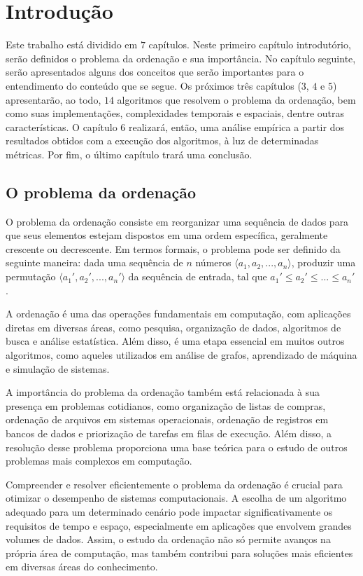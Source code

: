 \chapter{Introdução}\label{cap:introducao}
Este trabalho está dividido em $7$ capítulos. Neste primeiro capítulo introdutório, serão definidos o problema da ordenação e sua importância. No capítulo seguinte, serão apresentados alguns dos conceitos que serão importantes para o entendimento do conteúdo que se segue. Os próximos três capítulos ($3$, $4$ e $5$) apresentarão, ao todo, $14$ algoritmos que resolvem o problema da ordenação, bem como suas implementações, complexidades temporais e espaciais, dentre outras características. O capítulo $6$ realizará, então, uma análise empírica a partir dos resultados obtidos com a execução dos algoritmos, à luz de determinadas métricas. Por fim, o último capítulo trará uma conclusão.

\section{O problema da ordenação}
O problema da ordenação consiste em reorganizar uma sequência de dados para que seus elementos estejam dispostos em uma ordem específica, geralmente crescente ou decrescente. Em termos formais, o problema pode ser definido da seguinte maneira: dada uma sequência de  $n$  números  $\langle a_1, a_2, ..., a_n \rangle$, produzir uma permutação $\langle a_1', a_2', ..., a_n' \rangle$ da sequência de entrada, tal que $a_1' \le a_2' \le ... \le a_n'$  \cite[p. 5]{Cormen2009}.

A ordenação é uma das operações fundamentais em computação, com aplicações diretas em diversas áreas, como pesquisa, organização de dados, algoritmos de busca e análise estatística. Além disso, é uma etapa essencial em muitos outros algoritmos, como aqueles utilizados em análise de grafos, aprendizado de máquina e simulação de sistemas.

A importância do problema da ordenação também está relacionada à sua presença em problemas cotidianos, como organização de listas de compras, ordenação de arquivos em sistemas operacionais, ordenação de registros em bancos de dados e priorização de tarefas em filas de execução. Além disso, a resolução desse problema proporciona uma base teórica para o estudo de outros problemas mais complexos em computação.

Compreender e resolver eficientemente o problema da ordenação é crucial para otimizar o desempenho de sistemas computacionais. A escolha de um algoritmo adequado para um determinado cenário pode impactar significativamente os requisitos de tempo e espaço, especialmente em aplicações que envolvem grandes volumes de dados. Assim, o estudo da ordenação não só permite avanços na própria área de computação, mas também contribui para soluções mais eficientes em diversas áreas do conhecimento.
